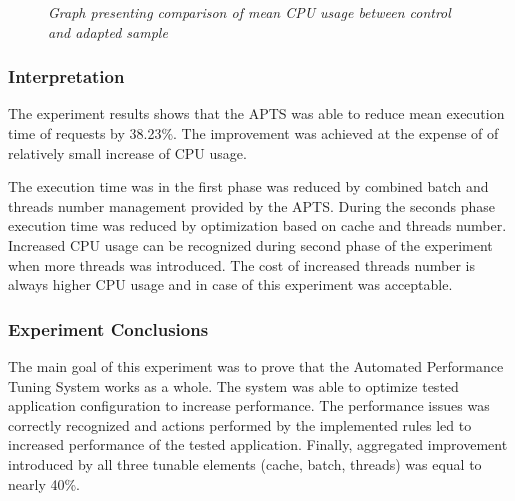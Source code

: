 \documentclass[12pt,a4paper]{article}
\begin{document}
\begin{figure}[!htb]
\centering
{}
\caption{\textit{Graph presenting comparison of mean CPU usage between control and adapted sample}} \label{figure:combined:results:cpuusage}
\end{figure}


\subsubsection{Interpretation} 

The experiment results shows that the APTS was able to reduce mean execution time of requests by 38.23\%. The improvement was achieved at the expense of of relatively small increase of CPU usage. 

The execution time was in the first phase was reduced by combined batch and threads number management provided by the APTS. During the seconds phase execution time was reduced by optimization based on cache and threads number. Increased CPU usage can be recognized during second phase of the experiment when more threads was introduced. The cost of increased threads number is always higher CPU usage and in case of this experiment was acceptable.  

\subsubsection{Experiment Conclusions} 

The main goal of this experiment was to prove that the Automated Performance Tuning System works as a whole. The system was able to optimize tested application configuration to increase performance. The performance issues was correctly recognized and actions performed by the implemented rules led to increased performance of the tested application. Finally, aggregated improvement introduced by all three tunable elements (cache, batch, threads) was equal to nearly 40\%.
\end{document}
